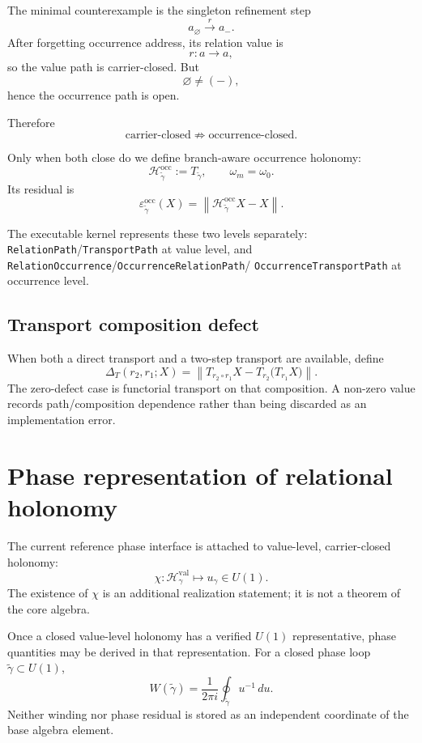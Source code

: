 \documentclass[11pt]{article}
\newcommand{\codeid}[1]{\nolinkurl{#1}}
\begin{document}
The minimal counterexample is the singleton refinement step
\[
a_{\varnothing}
\xrightarrow{r}
a_{-}.
\]
After forgetting occurrence address, its relation value is
\[
r:a\to a,
\]
so the value path is carrier-closed. But
\[
\varnothing\neq(-),
\]
hence the occurrence path is open.

Therefore
\[
\boxed{
\text{carrier-closed}
\not\Rightarrow
\text{occurrence-closed}.
}
\]

Only when both close do we define branch-aware occurrence holonomy:
\[
\boxed{
\mathcal H^{\mathrm{occ}}_{\widetilde\gamma}
:=
T_{\widetilde\gamma},
\qquad
\omega_m=\omega_0.
}
\]
Its residual is
\[
\boxed{
\varepsilon^{\mathrm{occ}}_{\widetilde\gamma}(X)
=
\left\|
\mathcal H^{\mathrm{occ}}_{\widetilde\gamma}X-X
\right\|.
}
\]

The executable kernel represents these two levels separately:
\texttt{RelationPath}/\texttt{TransportPath} at value level, and
\codeid{RelationOccurrence}/\codeid{OccurrenceRelationPath}/
\codeid{OccurrenceTransportPath} at occurrence level.

\subsection{Transport composition defect}

When both a direct transport and a two-step transport are available, define
\[
\boxed{
\Delta_T(r_2,r_1;X)
=
\left\|
T_{r_2\circ r_1}X
-
T_{r_2}\bigl(T_{r_1}X\bigr)
\right\|.
}
\]
The zero-defect case is functorial transport on that composition. A non-zero
value records path/composition dependence rather than being discarded as an
implementation error.

\section{Phase representation of relational holonomy}

The current reference phase interface is attached to value-level,
carrier-closed holonomy:
\[
\boxed{
\chi:
\mathcal H^{\mathrm{val}}_{\gamma}
\longmapsto
u_{\gamma}\in U(1).
}
\]
The existence of \(\chi\) is an additional realization statement; it is not a
theorem of the core algebra.

Once a closed value-level holonomy has a verified \(U(1)\) representative,
phase quantities may be derived in that representation. For a closed phase
loop \(\widetilde\gamma\subset U(1)\),
\[
\boxed{
W(\widetilde\gamma)
=
\frac{1}{2\pi i}
\oint_{\widetilde\gamma}u^{-1}\,du.
}
\]
Neither winding nor phase residual is stored as an independent coordinate of
the base algebra element.
\end{document}
